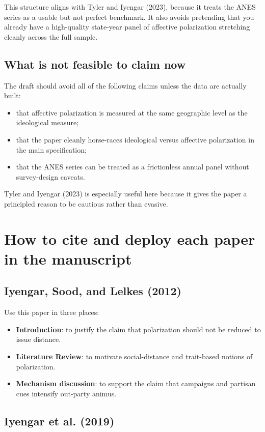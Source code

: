 \documentclass[12pt]{article}
\begin{document}
This structure aligns with Tyler and Iyengar (2023), because it treats the ANES series as a usable but not perfect benchmark. It also avoids pretending that you already have a high-quality state-year panel of affective polarization stretching cleanly across the full sample.

\subsection{What is not feasible to claim now}

The draft should avoid all of the following claims unless the data are actually built:
\begin{itemize}
    \item that affective polarization is measured at the same geographic level as the ideological measure;
    \item that the paper cleanly horse-races ideological versus affective polarization in the main specification;
    \item that the ANES series can be treated as a frictionless annual panel without survey-design caveats.
\end{itemize}

Tyler and Iyengar (2023) is especially useful here because it gives the paper a principled reason to be cautious rather than evasive.

\section{How to cite and deploy each paper in the manuscript}

\subsection{Iyengar, Sood, and Lelkes (2012)}

Use this paper in three places:
\begin{itemize}
    \item \textbf{Introduction}: to justify the claim that polarization should not be reduced to issue distance.
    \item \textbf{Literature Review}: to motivate social-distance and trait-based notions of polarization.
    \item \textbf{Mechanism discussion}: to support the claim that campaigns and partisan cues intensify out-party animus.
\end{itemize}

\subsection{Iyengar et al. (2019)}
\end{document}
